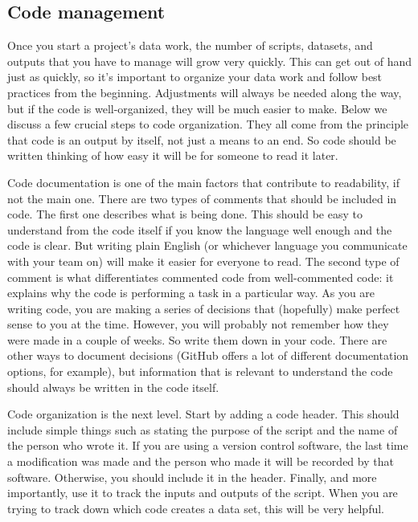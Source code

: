 \subsection{Code management}

Once you start a project's data work,
the number of scripts, datasets, and outputs that you have to manage will grow very quickly.
This can get out of hand just as quickly,
so it's important to organize your data work and follow best practices from the beginning.
Adjustments will always be needed along the way,
but if the code is well-organized, they will be much easier to make.
Below we discuss a few crucial steps to code organization.
They all come from the principle that code is an output by itself,
not just a means to an end.
So code should be written thinking of how easy it will be for someone to read it later.

Code documentation is one of the main factors that contribute to readability,
if not the main one.
There are two types of comments that should be included in code.
The first one describes what is being done.
This should be easy to understand from the code itself if you know the language well enough and the code is clear.
But writing plain English (or whichever language you communicate with your team on)
will make it easier for everyone to read.
The second type of comment is what differentiates commented code from well-commented code:
it explains why the code is performing a task in a particular way.
As you are writing code, you are making a series of decisions that
(hopefully) make perfect sense to you at the time.
However, you will probably not remember how they were made in a couple of weeks.
So write them down in your code.
There are other ways to document decisions
(GitHub offers a lot of different documentation options, for example),
but information that is relevant to understand the code should always be written in the code itself.

Code organization is the next level.
Start by adding a code header.
This should include simple things such as stating the purpose of the script and the name of the person who wrote it.
If you are using a version control software,
the last time a modification was made and the person who made it will be recorded by that software.
Otherwise, you should include it in the header.
Finally, and more importantly, use it to track the inputs and outputs of the script.
When you are trying to track down which code creates a data set, this will be very helpful.

